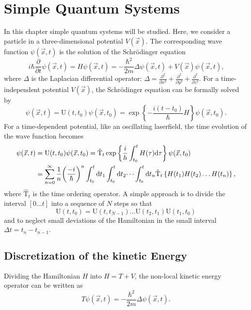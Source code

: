 \documentclass[twoside,        %
			   12pt,			%
               BCOR10mm,       %
               ngerman,english  %
               ]{scrartcl}
\begin{document}
\section{Simple Quantum Systems}\label{1}
In this chapter simple quantum systems will be studied. Here, we consider a particle in a three-dimensional potential $V(\vec{x})$. The corresponding wave function $\psi(\vec{x}, t)$ is the solution of the Schrödinger equation
\begin{equation}
  i\hbar \frac{\partial}{\partial t} \psi(\vec{x}, t) = H \psi(\vec{x}, t) = - \frac{\hbar^2}{2m}	\Delta \psi(\vec{x}, t)+  V(\vec{x}) \psi(\vec{x}, t) \text{,}
\end{equation}
where $\Delta$ is the Laplacian differential operator: $\Delta = \frac{\partial^2}{\partial x^2} +\frac{\partial^2}{\partial y^2} + \frac{\partial^2}{\partial z^2} $. For a time-independent potential $V(\vec{x})$, the Schrödinger equation can be formally solved by 
\begin{equation}
     \psi(\vec{x}, t) = \text{U}(t, t_0) \psi(\vec{x}, t_0)   = \exp \left\{ - \frac{i(t-t_0) }{\hbar} H \right\}  \psi(\vec{x}, t_0) \text{.}
\end{equation} 
For a time-dependent potential, like an oscillating laserfield, the time evolution of the wave function becomes
\begin{align}
   \psi(\vec{x}, t) &= \text{U}(t, t_0) \psi(\vec{x}, t_0)  = \hat{\text{T}}_t  \exp \left\{ \frac{i}{h} \int_{t_0}^t H(\tau) \mathrm{d} \tau \right \}  \psi(\vec{x}, t_0)  \\
   &=  \sum_{n = 0}^\infty \frac{1}{n} {\left( \frac{- i}{\hbar} \right) }^n \int_{t_0}^t \mathrm{d} t_1\int_{t_0}^t \mathrm{d} t_2 \dots \int_{t_0}^t \mathrm{d} t_n \hat{\text{T}}_t \left\{ H(t_1)H(t_2) \dots H(t_n) \right\} \text{,} \nonumber
\end{align} 
where $\hat{\text{T}}_t$ is the time ordering operator. A simple approach is to divide the interval $[0 \dots t]$ into a sequence of $N$ steps so that
\begin{equation}
   \text{U}(t, t_0) = \text{U}(t, t_{N-1}) \dots \text{U}(t_2, t_1)\text{U}(t_1, t_0)
\end{equation}   and to neglect small deviations of the Hamiltonian in the small interval $\Delta t = t_n - t_{n-1}$.
   
\subsection{Discretization of the kinetic Energy}
Dividing the Hamiltonian $H$ into $H = T + V$, the non-local kinetic energy operator can be written as
\begin{equation}
    T \psi(\vec{x}, t) = - \frac{\hbar^2}{2m} \Delta \psi(\vec{x}, t) \text{.}
\end{equation}
    
\end{document}
